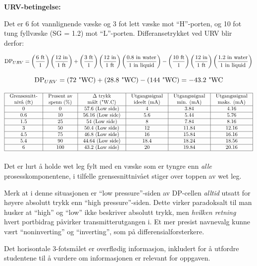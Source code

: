 \vskip 10pt

\noindent
{\bf URV-betingelse:}

Det er 6 fot vannlignende væske og 3 fot lett væske mot ``H''-porten, og 10 fot tung fyllvæske (SG = 1.2) mot ``L''-porten.  Differansetrykket ved URV blir derfor:

$$\hbox{DP}_{URV} = \left(6 \hbox{ ft} \over 1 \right) \left(12 \hbox{ in} \over 1 \hbox{ ft}\right) + \left(3 \hbox{ ft} \over 1 \right) \left(12 \hbox{ in} \over 1 \hbox{ ft}\right) \left(0.8 \hbox{ in water} \over 1 \hbox{ in liquid} \right) - \left(10 \hbox{ ft} \over 1 \right) \left(12 \hbox{ in} \over 1 \hbox{ ft}\right) \left(1.2 \hbox{ in water} \over 1 \hbox{ in liquid} \right) $$

$$\hbox{DP}_{URV} = (72 \hbox{ "WC}) + (28.8 \hbox{ "WC}) - (144 \hbox{ "WC}) = -43.2 \hbox{ "WC}$$


$$\vbox{\offinterlineskip
\halign{\strut
\vrule \quad\hfil # \ \hfil & 
\vrule \quad\hfil # \ \hfil & 
\vrule \quad\hfil # \ \hfil & 
\vrule \quad\hfil # \ \hfil & 
\vrule \quad\hfil # \ \hfil & 
\vrule \quad\hfil # \ \hfil \vrule \cr
\noalign{\hrule}
%
Grensesnitt- & Prosent av & $\Delta$ trykk & Utgangssignal & Utgangssignal & Utgangssignal \cr
%
nivå (ft) & spenn (\%) & målt ("W.C) & ideelt (mA) & min. (mA) & maks. (mA) \cr
%
\noalign{\hrule}
%
0 & 0 & 57.6 (Low side) & 4 & 3.84 & 4.16 \cr
%
\noalign{\hrule}
%
0.6 & 10 & 56.16 (Low side) & 5.6 & 5.44 & 5.76 \cr
%
\noalign{\hrule}
%
1.5 & 25 & 54 (Low side) & 8 & 7.84 & 8.16 \cr
%
\noalign{\hrule}
%
3 & 50 & 50.4 (Low side) & 12 & 11.84 & 12.16 \cr
%
\noalign{\hrule}
%
4.5  & 75 & 46.8 (Low side) & 16 & 15.84 & 16.16 \cr
%
\noalign{\hrule}
%
5.4 & 90 & 44.64 (Low side) & 18.4 & 18.24 & 18.56 \cr
%
\noalign{\hrule}
%
6 & 100 & 43.2 (Low side) & 20 & 19.84 & 20.16 \cr
%
\noalign{\hrule}
} %
}$$ %

Det er lurt å holde wet leg fylt med en væske som er tyngre enn {\it alle} prosesskomponentene, i tilfelle grensesnittnivået stiger over toppen av wet leg.

\vskip 10pt

Merk at i denne situasjonen er ``low pressure''-siden av DP-cellen {\it alltid} utsatt for høyere absolutt trykk enn ``high pressure''-siden.  Dette virker paradoksalt til man husker at ``high'' og ``low'' ikke beskriver absolutt trykk, men {\it hvilken retning} hvert portbidrag påvirker transmitterutgangen i.  Et mer presist navnevalg kunne vært ``noninverting'' og ``inverting'', som på differensialforsterkere.

\vskip 10pt

Det horisontale 3-fotsmålet er overflødig informasjon, inkludert for å utfordre studentene til å vurdere om informasjonen er relevant for oppgaven.


